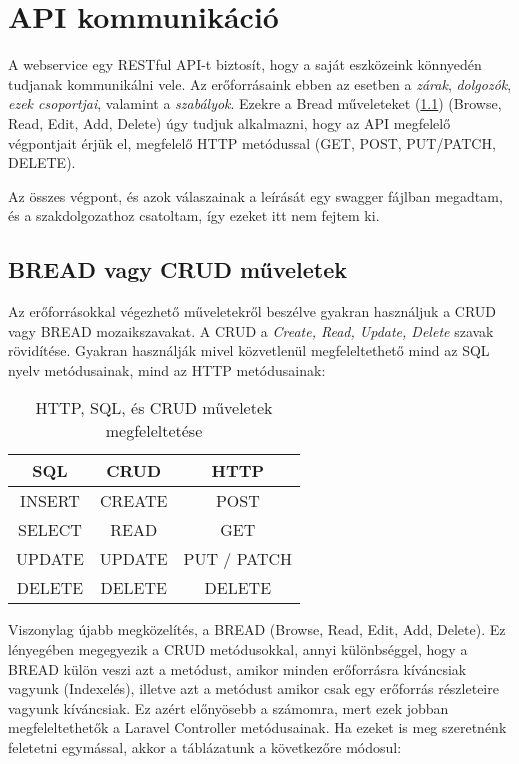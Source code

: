 \documentclass[a4paper,12pt]{thesis-ekf}
\theoremstyle{definition}
\begin{document}
	\chapter{API kommunikáció}
		A webservice egy RESTful API-t biztosít, hogy a saját eszközeink könnyedén tudjanak kommunikálni vele. Az erőforrásaink ebben az esetben a \emph{zárak}, \emph{dolgozók}, \emph{ezek csoportjai}, valamint a \emph{szabályok}. Ezekre a Bread műveleteket (\ref{sc-bread}) (Browse, Read, Edit, Add, Delete) úgy tudjuk alkalmazni, hogy az API megfelelő végpontjait érjük el, megfelelő HTTP metódussal (GET, POST, PUT/PATCH, DELETE).
		
		Az összes végpont, és azok válaszainak a leírását egy swagger fájlban megadtam, és a szakdolgozathoz csatoltam, így ezeket itt nem fejtem ki.
		
		\section{BREAD vagy CRUD műveletek}\label{sc-bread}
			Az erőforrásokkal végezhető műveletekről beszélve gyakran használjuk a CRUD vagy BREAD mozaikszavakat. A CRUD a \emph{Create, Read, Update, Delete} szavak rövidítése. Gyakran használják mivel közvetlenül megfeleltethető mind az SQL nyelv metódusainak, mind az HTTP metódusainak:
			
			\begin{table}[h!]
				\centering
				\begin{tabular}{|c | c | c|}
					\hline
					\multicolumn{1}{|c|}{\textbf{SQL}} & \textbf{CRUD} & \textbf{HTTP} \\ \hline
					INSERT & CREATE & POST \\ \hline
					SELECT & READ & GET \\ \hline
					UPDATE & UPDATE & PUT / PATCH \\ \hline
					DELETE & DELETE & DELETE \\ \hline
				\end{tabular}
				\caption{HTTP, SQL, és CRUD műveletek megfeleltetése}
				\label{table:http-sql-crud}
			\end{table}
		
			Viszonylag újabb megközelítés, a BREAD (Browse, Read, Edit, Add, Delete). Ez lényegében megegyezik a CRUD metódusokkal, annyi különbséggel, hogy a BREAD külön veszi azt a metódust, amikor minden erőforrásra kíváncsiak vagyunk (Indexelés), illetve azt a metódust amikor csak egy erőforrás részleteire vagyunk kíváncsiak. Ez azért előnyösebb a számomra, mert ezek jobban megfeleltethetők a Laravel Controller metódusainak. Ha ezeket is meg szeretnénk feletetni egymással, akkor a táblázatunk a következőre módosul:
	
\end{document}
